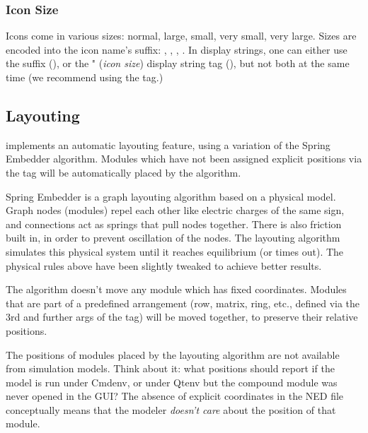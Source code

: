 \subsubsection{Icon Size}
\label{sec:graphics:icon-size}

Icons come in various sizes: normal, large, small, very small, very large.
Sizes are encoded into the icon name's suffix: , ,
, . In display strings, one can either use the suffix
(), or the " (\textit{icon size})
display string tag (), but not both at the same
time (we recommend using the  tag.)


\subsection{Layouting}
\label{sec:graphics:compound-module-layouting}

{\opp} implements an automatic layouting feature, using a variation of the
Spring Embedder algorithm. Modules which have not been assigned explicit
positions via the  tag will be automatically placed by the
algorithm.

Spring Embedder is a graph layouting algorithm based on a physical model.
Graph nodes (modules) repel each other like electric charges of the same
sign, and connections act as springs that pull nodes together. There is
also friction built in, in order to prevent oscillation of the nodes. The
layouting algorithm simulates this physical system until it reaches
equilibrium (or times out). The physical rules above have been slightly
tweaked to achieve better results.

The algorithm doesn't move any module which has fixed coordinates. Modules
that are part of a predefined arrangement (row, matrix, ring, etc., defined
via the 3rd and further args of the  tag) will be moved together,
to preserve their relative positions.

\begin{note}
The positions of modules placed by the layouting algorithm are not
available from simulation models. Think about it: what positions should
{\opp} report if the model is run under Cmdenv, or under Qtenv but
the compound module was never opened in the GUI? The absence of explicit
coordinates in the NED file conceptually means that the modeler
\textit{doesn't care} about the position of that module.
\end{note}

